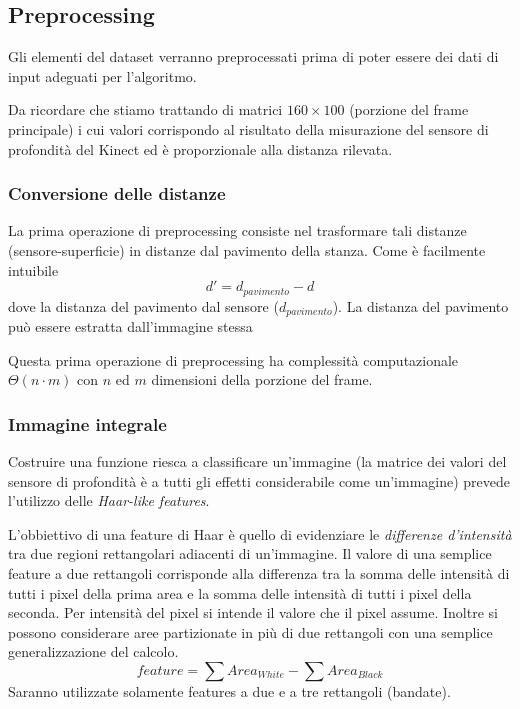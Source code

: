 \documentclass[a4paper,11pt,oneside]{article}
\begin{document}

		\subsection{Preprocessing} %
		\label{sub:preprocessing}
			Gli elementi del dataset verranno preprocessati prima di poter essere dei dati di input adeguati per l'algoritmo.

			Da ricordare che stiamo trattando di matrici $160 \times 100$ (porzione del frame principale) i cui valori corrispondo al risultato della misurazione del sensore di profondità del Kinect ed è proporzionale alla distanza rilevata.

			\subsubsection{Conversione delle distanze} %
			\label{ssub:conversione_delle_distanze}
				La prima operazione di preprocessing consiste nel trasformare tali distanze (sensore-superficie) in distanze dal pavimento della stanza. Come è facilmente intuibile
				$$ d' = d_{pavimento} - d $$
				dove la distanza del pavimento dal sensore ($d_{pavimento}$). La distanza del pavimento può essere estratta dall'immagine stessa 

				Questa prima operazione di preprocessing ha complessità computazionale $\Theta(n \cdot m)$ con $n$ ed $m$ dimensioni della porzione del frame.

			\subsubsection{Immagine integrale} %
			\label{ssub:immagine_integrale}
				Costruire una funzione riesca a classificare un'immagine (la matrice dei valori del sensore di profondità è a tutti gli effetti considerabile come un'immagine) prevede l'utilizzo delle \emph{Haar-like features}.

				L'obbiettivo di una feature di Haar è quello di evidenziare le \emph{differenze d'intensità} tra due regioni rettangolari adiacenti di un'immagine. Il valore di una semplice feature a due rettangoli corrisponde alla differenza tra la somma delle intensità di tutti i pixel della prima area e la somma delle intensità di tutti i pixel della seconda. Per intensità del pixel si intende il valore che il pixel assume. Inoltre si possono considerare aree partizionate in più di due rettangoli con una semplice generalizzazione del calcolo.
				$$feature = \sum Area_{White} - \sum Area_{Black}$$
				Saranno utilizzate solamente features a due e a tre rettangoli (bandate).
\end{document}
